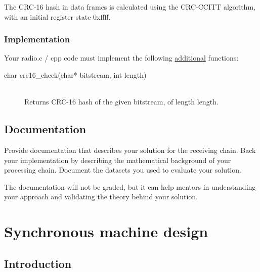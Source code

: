 \documentclass{article}
\begin{document}
The CRC-16 hash in data frames is calculated using the CRC-CCITT algorithm, with an initial register state \textsf{0xffff}.

\subsubsection{Implementation}
Your \textsf{radio.c / cpp} code must implement the following \underline{additional} functions:
\begin{description}
	\item[char crc16\_check(char* bitstream, int length)]
	\,\\ Returns CRC-16 hash of the given \textsf{bitstream}, of length \textsf{length}.
\end{description}

\subsection{Documentation}

Provide documentation that describes your solution for the receiving chain. Back your implementation by describing the mathematical background of your processing chain. Document the datasets you used to evaluate your solution.

The documentation will not be graded, but it can help mentors in understanding your approach and validating the theory behind your solution.
	
\newpage
\section{Synchronous machine design}

\subsection{Introduction}
\end{document}
